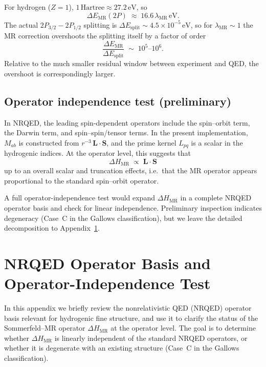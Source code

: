 \documentclass[11pt,a4paper]{article}
\newcommand{\DeltaHM}{\Delta H_{\mathrm{MR}}}
\begin{document}
For hydrogen ($Z=1$),
$1\,\text{Hartree} \approx 27.2\,\text{eV}$, so
\begin{equation}
  \Delta E_{\mathrm{MR}}(2P)
  \;\approx\;
  16.6\,\lambda_{\mathrm{MR}}\,\text{eV}.
\end{equation}
The actual $2P_{3/2}-2P_{1/2}$ splitting is
$\Delta E_{\mathrm{split}} \sim 4.5\times 10^{-5}\,\text{eV}$, so for
$\lambda_{\mathrm{MR}} \sim 1$ the MR correction overshoots the
splitting itself by a factor of order
\begin{equation}
  \frac{\Delta E_{\mathrm{MR}}}{\Delta E_{\mathrm{split}}}
  \;\sim\;
  10^5\text{--}10^6.
\end{equation}
Relative to the much smaller residual window between experiment and QED,
the overshoot is correspondingly larger.

\subsection{Operator independence test (preliminary)}
\label{app:operator-independence}
In NRQED, the leading spin-dependent operators include the spin--orbit
term, the Darwin term, and spin--spin/tensor terms. In the present
implementation, $M_{ab}$ is constructed from $r^{-3}\,\mathbf{L}\cdot\mathbf{S}$,
and the prime kernel $L_{pq}$ is a scalar in the hydrogenic indices. At
the operator level, this suggests that
\begin{equation}
  \Delta H_{\mathrm{MR}}
  \;\propto\;
  \mathbf{L}\cdot\mathbf{S}
\end{equation}
up to an overall scalar and truncation effects, i.e.\ that the MR
operator appears proportional to the standard spin--orbit operator.

A full operator-independence test would expand $\Delta H_{\mathrm{MR}}$
in a complete NRQED operator basis and check for linear independence.
Preliminary inspection indicates degeneracy (Case~C in the Gallows
classification), but we leave the detailed decomposition to
Appendix~\ref{app:nrqed-basis}.


\section{NRQED Operator Basis and Operator-Independence Test}
\label{app:nrqed-basis}

In this appendix we briefly review the nonrelativistic QED (NRQED)
operator basis relevant for hydrogenic fine structure, and use it to
clarify the status of the Sommerfeld--MR operator $\DeltaHM$ at the
operator level. The goal is to determine whether $\DeltaHM$ is
linearly independent of the standard NRQED operators, or whether it is
degenerate with an existing structure (Case~C in the Gallows
classification).
\end{document}
